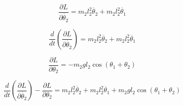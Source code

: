 \documentclass[fleqn]{article}
\begin{document}
\begin{equation}
\frac{\partial{L}}{\partial{\dot{\theta_2}}} = m_2l_2^2\dot{\theta_2}+m_2l_2^2\dot{\theta_1}
\end{equation}

\begin{equation}
\frac{d}{dt}\left(\frac{\partial{L}}{\partial{\dot{\theta_2}}}\right) = m_2l_2^2\ddot{\theta_2}+m_2l_2^2\ddot{\theta_1}
\end{equation}

\begin{equation}
\frac{\partial{L}}{\partial{\theta_2}} = -m_2gl_2\cos(\theta_1+\theta_2)
\end{equation}

\begin{equation}
\frac{d}{dt}\left(\frac{\partial{L}}{\partial{\dot{\theta_2}}}\right) - \frac{\partial{L}}{\partial{\theta_2}} = m_2l_2^2\ddot{\theta_2}+m_2l_2^2\ddot{\theta_1} + m_2gl_2\cos(\theta_1+\theta_2)
\end{equation}
\end{document}
